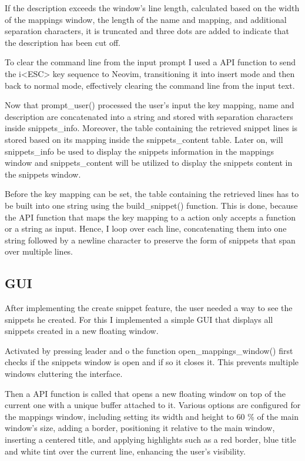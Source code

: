\documentclass[runningheads]{llncs}
\begin{document}
If the description exceeds the window's line length, calculated based on the width of the mappings window, the length of the name and mapping, and additional 
separation characters, it is truncated and three dots are added to indicate that the description has been cut off.

To clear the command line from the input prompt I used a API function to send the i<ESC> key sequence to Neovim, 
transitioning it into insert mode and then back to normal mode, effectively clearing the command line from the input text.

Now that prompt\_user() processed the user's input the key mapping, name and description are concatenated into a string and stored with separation 
characters inside snippets\_info.
Moreover, the table containing the retrieved snippet lines is stored based on its mapping inside the snippets\_content table.
Later on, will snippets\_info be used to display the snippets information in the mappings window and snippets\_content will be utilized to 
display the snippets content in the snippets window.

Before the key mapping can be set, the table containing the retrieved lines has to be built into one string using the build\_snippet() function.
This is done, because the API function that maps the key mapping to a action only accepts a function or a string as input.
Hence, I loop over each line, concatenating them into one string followed by a newline character to preserve the form of snippets that span over multiple lines.


\subsection{GUI}
After implementing the create snippet feature, the user needed a way to see the snippets he created. 
For this I implemented a simple GUI that displays all snippets created in a new floating window.

Activated by pressing leader and o the function open\_mappings\_window() first checks
if the snippets window is open and if so it closes it. This prevents multiple windows cluttering the interface. 

Then a API function is called that opens a new floating window on top of the current one with a unique buffer attached to it.
Various options are configured for the mappings window, including setting its width and height to 60 \% of the main window's size,
adding a border, positioning it relative to the main window, inserting a centered title, and applying highlights such as a red border,
blue title and white tint over the current line, enhancing the user's visibility.
\end{document}
